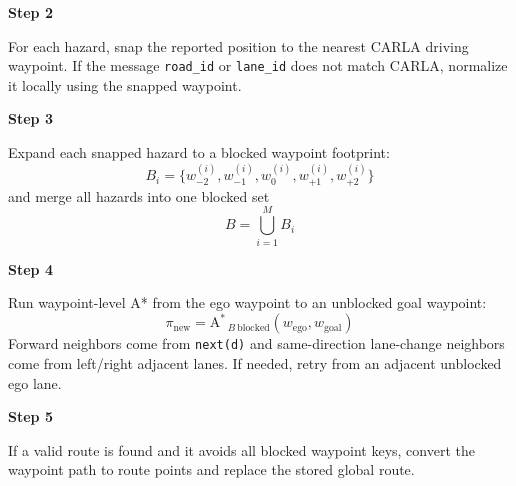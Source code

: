 \documentclass[11pt]{article}
\begin{document}
\textbf{Step 2}

For each hazard, snap the reported position to the nearest CARLA driving waypoint. If the message \texttt{road\_id} or \texttt{lane\_id} does not match CARLA, normalize it locally using the snapped waypoint.

\textbf{Step 3}

Expand each snapped hazard to a blocked waypoint footprint:
\[
B_i=\{w^{(i)}_{-2},w^{(i)}_{-1},w^{(i)}_0,w^{(i)}_{+1},w^{(i)}_{+2}\}
\]
and merge all hazards into one blocked set
\[
B=\bigcup_{i=1}^{M} B_i
\]

\textbf{Step 4}

Run waypoint-level A* from the ego waypoint to an unblocked goal waypoint:
\[
\pi_{\mathrm{new}}
=
\operatorname{A^*}_{\,B\ \mathrm{blocked}}
\left(w_{\mathrm{ego}},w_{\mathrm{goal}}\right)
\]
Forward neighbors come from \texttt{next(d)} and same-direction lane-change neighbors come from left/right adjacent lanes. If needed, retry from an adjacent unblocked ego lane.

\textbf{Step 5}

If a valid route is found and it avoids all blocked waypoint keys, convert the waypoint path to route points and replace the stored global route.
\end{document}

